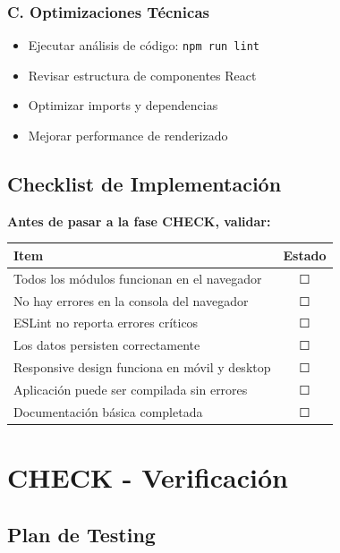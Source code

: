 \documentclass[12pt,a4paper]{report}
\begin{document}
\subsection{C. Optimizaciones Técnicas}
\begin{itemize}
    \item Ejecutar análisis de código: \texttt{npm run lint}
    \item Revisar estructura de componentes React
    \item Optimizar imports y dependencias
    \item Mejorar performance de renderizado
\end{itemize}

\section{Checklist de Implementación}

\textcolor{verde}{\textbf{Antes de pasar a la fase CHECK, validar:}}

\begin{table}[h]
    \centering
    \begin{tabular}{|p{8cm}|c|}
        \hline
        \rowcolor{grisClaro}
        \textbf{Item} & \textbf{Estado} \\
        \hline
        Todos los módulos funcionan en el navegador & ☐ \\
        \hline
        No hay errores en la consola del navegador & ☐ \\
        \hline
        ESLint no reporta errores críticos & ☐ \\
        \hline
        Los datos persisten correctamente & ☐ \\
        \hline
        Responsive design funciona en móvil y desktop & ☐ \\
        \hline
        Aplicación puede ser compilada sin errores & ☐ \\
        \hline
        Documentación básica completada & ☐ \\
        \hline
    \end{tabular}
\end{table}

\chapter{CHECK - Verificación}

\section{Plan de Testing}
\end{document}
